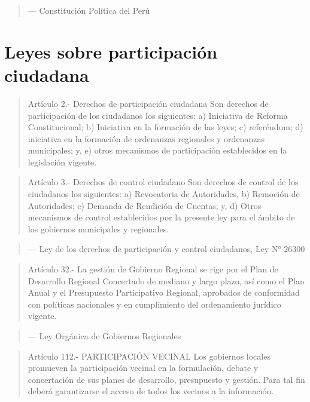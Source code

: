 \documentclass[
]{book}
\begin{document}
\begin{quote}
--- Constitución Política del Perú
\end{quote}

\hypertarget{leyes-sobre-participaciuxf3n-ciudadana}{%
\section{Leyes sobre participación ciudadana}\label{leyes-sobre-participaciuxf3n-ciudadana}}

\begin{quote}
Artículo 2.- Derechos de participación ciudadana
Son derechos de participación de los ciudadanos los siguientes:
a) Iniciativa de Reforma Constitucional;
b) Iniciativa en la formación de las leyes;
c) referéndum;
d) iniciativa en la formación de ordenanzas regionales y ordenanzas municipales; y,
e) otros mecanismos de participación establecidos en la legislación vigente.
\end{quote}

\begin{quote}
Artículo 3.- Derechos de control ciudadano
Son derechos de control de los ciudadanos los siguientes:
a) Revocatoria de Autoridades,
b) Remoción de Autoridades;
c) Demanda de Rendición de Cuentas; y,
d) Otros mecanismos de control establecidos por la presente ley para el ámbito de los gobiernos municipales y regionales.
\end{quote}

\begin{quote}
--- Ley de los derechos de participación y control ciudadanos, Ley N° 26300
\end{quote}

\begin{quote}
Artículo 32.- La gestión de Gobierno Regional se rige por el Plan de Desarrollo Regional Concertado de mediano y largo plazo, así
como el Plan Anual y el Presupuesto Participativo Regional, aprobados de conformidad con políticas nacionales y en cumplimiento
del ordenamiento jurídico vigente.
\end{quote}

\begin{quote}
--- Ley Orgánica de Gobiernos Regionales
\end{quote}

\begin{quote}
Artículo 112.- PARTICIPACIÓN VECINAL
Los gobiernos locales promueven la participación vecinal en la formulación, debate y concertación de sus planes de desarrollo,
presupuesto y gestión. Para tal fin deberá garantizarse el acceso de todos los vecinos a la información.
\end{quote}
\end{document}
